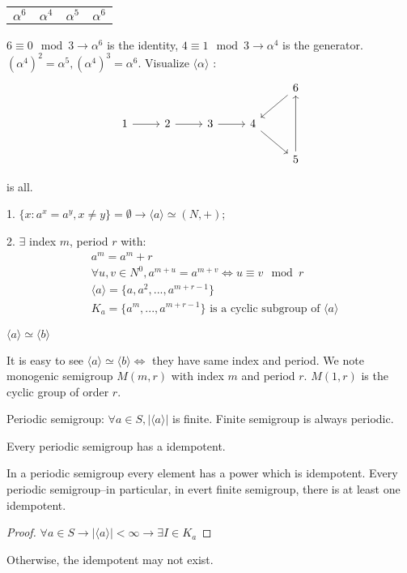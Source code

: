 \begin{Exap}
\begin{center}
\begin{tabular}{c|ccc}
            $\alpha^6$ & $\alpha^4$ & $\alpha^5$ & $\alpha^6$ \\
        \end{tabular}
    \end{center}
    $6\equiv 0 \mod{3} \rightarrow \alpha^6$ is the identity, $4\equiv 1\mod{3}\rightarrow \alpha^4$ is the generator. $(\alpha^4)^2=\alpha^5, (\alpha^4)^3=\alpha^6$.
    Visualize $\langle \alpha \rangle$ :
    \[\begin{tikzcd}
        &&&& 6   
            \arrow[ld]  \\
        1 \arrow[r] &
        2 \arrow[r] & 
        3 \arrow[r] &
        4 \arrow[dr] &  \\
        &&&&  5
            \arrow[uu]
    \end{tikzcd}\]
\end{Exap}

\begin{Them} is all.

    1. $\{x:a^x=a^y,x\neq y\} = \emptyset \rightarrow \langle a\rangle \simeq (N,+)$;

    2. $\exists$ index $m$, period $r$ with:
    \begin{align*}
        &a^m=a^m+r   \\
        &\forall u,v \in N^0, a^{m+u}=a^{m+v} \Leftrightarrow u \equiv v \mod{r}    \\
        &\langle a\rangle =\{a,a^2,...,a^{m+r-1}\}  \\
        &K_a=\{a^m,...,a^{m+r-1}\} \text{ is a cyclic subgroup of }\langle a\rangle
    \end{align*}
\end{Them}

\begin{Rmk}$\langle a\rangle \simeq \langle b\rangle$

    It is easy to see $\langle a\rangle \simeq \langle b\rangle \Leftrightarrow $ they have same index and period.
    We note monogenic semigroup $M(m,r)$ with index $m$ and period $r$.
    $M(1,r)$ is the cyclic group of order $r$.

    Periodic semigroup: $\forall a \in S, |\langle a \rangle|$ is finite.
    Finite semigroup is always periodic.
\end{Rmk}

\begin{Prop}Every periodic semigroup has a idempotent.
    
    In a periodic semigroup every element has a power which is idempotent. 
    Every periodic semigroup--in particular, in evert finite semigroup, there is at least one idempotent.
    \begin{proof}
        $\forall a \in S \rightarrow |\langle a\rangle| < \infty\rightarrow \exists I \in K_a$
    \end{proof}
    Otherwise, the idempotent may not exist.
\end{Prop}

